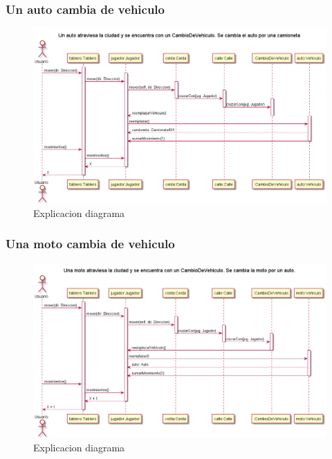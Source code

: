 \documentclass[titlepage,a4paper]{article}
\begin{document}
\subsubsection[]{Un auto cambia de vehiculo}

\begin{figure}[H]
  \centering
  \includegraphics[width=1\textwidth]{diagramas/SecuenciaAutoCambiaVehiculo.png}
  \caption{\label{fig:class01}Explicacion diagrama}
\end{figure}



\subsubsection[]{Una moto cambia de vehiculo}

\begin{figure}[H]
  \centering
  \includegraphics[width=1\textwidth]{diagramas/SecuenciaMotoCambiaVehiculo.png}
  \caption{\label{fig:class01}Explicacion diagrama}
\end{figure}
\end{document}
